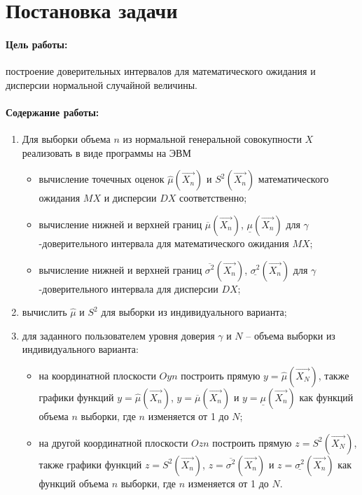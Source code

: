 
\section{Постановка задачи}

\paragraph{Цель работы:} построение доверительных интервалов для математического ожидания и дисперсии нормальной случайной величины.

\paragraph{Содержание работы:}

\begin{enumerate}
    \item Для выборки объема $n$ из нормальной генеральной совокупности $X$ реализовать в виде программы на ЭВМ
    \begin{itemize}
        \item вычисление точечных оценок $\hat{\mu}(\vec{X_n})$ и $S^2(\vec{X_n})$ математического ожидания $MX$ и дисперсии $DX$ соответственно;
        \item вычисление нижней и верхней границ $\overline{\mu}(\vec{X_n})$, $\underline{\mu}(\vec{X_n})$ для $\gamma$-доверительного интервала для математического ожидания $MX$;
        \item вычисление нижней и верхней границ $\overline{\sigma^2}(\vec{X_n})$, $\underline{\sigma^2}(\vec{X_n})$ для $\gamma$-доверительного интервала для дисперсии $DX$;
    \end{itemize}
    \item вычислить $\hat{\mu}$ и $S^2$ для выборки из индивидуального варианта;
    \item для заданного пользователем уровня доверия $\gamma$ и $N$ – объема выборки из индивидуального варианта:
    \begin{itemize}
        \item на координатной плоскости $Oyn$ построить прямую $y = \hat{\mu}(\vec{X_N})$, также графики функций $y = \hat{\mu}(\vec{X_n})$, $y = \overline{\mu}(\vec{X_n})$ и $y = \underline{\mu}(\vec{X_n})$ как функций объема $n$ выборки, где $n$ изменяется от 1 до $N$;
        \item на другой координатной плоскости $Ozn$ построить прямую $z = S^2(\vec{X_N})$, также графики функций $z = S^2(\vec{X_n})$, $z = \overline{\sigma^2}(\vec{X_n})$ и $z = \underline{\sigma^2}(\vec{X_n})$ как функций объема $n$ выборки, где $n$ изменяется от 1 до $N$.
    \end{itemize}
\end{enumerate}